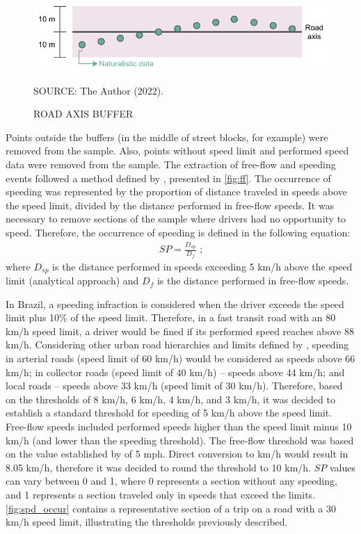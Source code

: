 \begin{figure}[!htbp]
    \centering\footnotesize
    \captionsetup{font=footnotesize}
    \caption{ROAD AXIS BUFFER}
    \includegraphics{fig/buffer.pdf}
    \label{fig:buffer}
    \par SOURCE: The Author (2022).
\end{figure}

Points outside the buffers (in the middle of street blocks, for example) were removed from the sample. Also, points without speed limit and performed speed data were removed from the sample. The extraction of free-flow and speeding events followed a method defined by \textcite{Richard2013}, presented in \autoref{fig:ff}. The occurrence of speeding was represented by the proportion of distance traveled in speeds above the speed limit, divided by the distance performed in free-flow speeds. It was necessary to remove sections of the sample where drivers had no opportunity to speed. Therefore, the occurrence of speeding is defined in the following equation: \begin{align}
    SP = \frac{D_{sp}}{D_{f}} \mbox{ ;} 
    \label{eq:sp}
\end{align} where $D_{sp}$ is the distance performed in speeds exceeding 5 km/h above the speed limit (analytical approach) and $D_{f}$ is the distance performed in free-flow speeds. 

In Brazil, a speeding infraction is considered when the driver exceeds the speed limit plus 10\% of the speed limit. Therefore, in a fast transit road with an 80 km/h speed limit, a driver would be fined if its performed speed reaches above 88 km/h. Considering other urban road hierarchies and limits defined by \textcite{Brasil1997}, speeding in arterial roads (speed limit of 60 km/h) would be considered as speeds above 66 km/h; in collector roads (speed limit of 40 km/h) – speeds above 44 km/h; and local roads – speeds above 33 km/h (speed limit of 30 km/h). Therefore, based on the thresholds of 8 km/h, 6 km/h, 4 km/h, and 3 km/h, it was decided to establish a standard threshold for speeding of 5 km/h above the speed limit. Free-flow speeds included performed speeds higher than the speed limit minus 10 km/h (and lower than the speeding threshold). The free-flow threshold was based on the value established by \textcite{Richard2017} of 5 mph. Direct conversion to km/h would result in 8.05 km/h, therefore it was decided to round the threshold to 10 km/h. $SP$ values can vary between 0 and 1, where 0 represents a section without any speeding, and 1 represents a section traveled only in speeds that exceed the limits. \autoref{fig:spd_occur} contains a representative section of a trip on a road with a 30 km/h speed limit, illustrating the thresholds previously described.   

